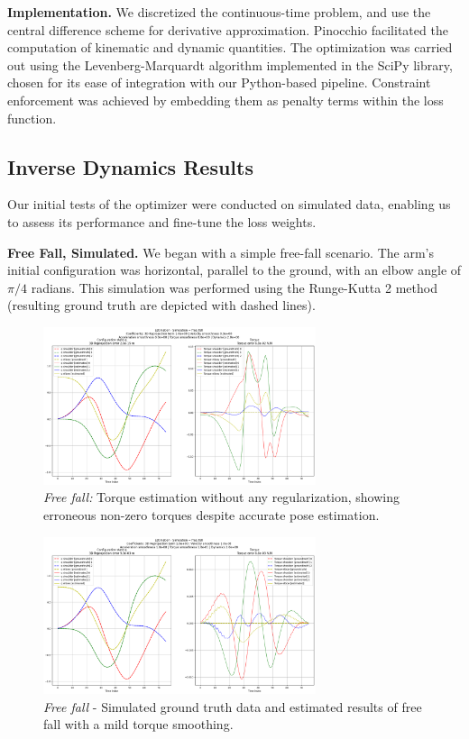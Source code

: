 \noindent\textbf{Implementation.} We discretized the continuous-time problem, 
and use the central difference scheme for derivative approximation. 
Pinocchio facilitated the computation of kinematic and dynamic quantities. 
The optimization was carried out using the Levenberg-Marquardt algorithm implemented in the SciPy library, 
chosen for its ease of integration with our Python-based pipeline. 
Constraint enforcement was achieved by embedding them as penalty terms within the loss function.

\subsection{Inverse Dynamics Results}
\label{subsec:dynamic_results}

Our initial tests of the optimizer were conducted on simulated data, enabling us to assess its performance and fine-tune the loss weights.

\noindent\textbf{Free Fall, Simulated.} We began with a simple free-fall scenario. The arm's initial configuration was horizontal, parallel to the ground, with an elbow angle of 
\(\pi/4\) radians. This simulation was performed using the Runge-Kutta 2 method (resulting ground truth are depicted with dashed lines).
\begin{figure}
    \centering
    \includegraphics[width=8cm]{figures/inverse_dynamics_free_fall_case_no_smoothing.png}
    \caption{\textit{Free fall:} Torque estimation without any regularization, showing erroneous non-zero torques despite accurate pose estimation.}
    \label{fig:free_fall_torque_no_smoothing}
\end{figure}


\begin{figure}
    \centering
    \includegraphics[width=8cm]{figures/inverse_dynamics_free_fall_case_torque_smooth_e-1.png}
    \caption{\textit{Free fall} - Simulated ground truth data and estimated results of free fall with a mild torque smoothing.}
    \label{fig:free_fall_torque_smoothing}
\end{figure}

